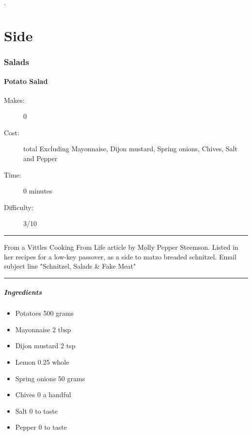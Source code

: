 \documentclass[]{article}
\begin{document}
\newpage
\color{white}.\color{black}
\vspace{5cm}
\part{\Huge Side}
\newpage
{}
\section*{\center\Huge\color{accent}Salads}
\label{cat:Salads}
\label{rec:Potato Salad}
\subsection*{\center\huge Potato Salad}
\begin{description}
\item[Makes:] 0 
\item[Cost:]  total Excluding Mayonnaise, Dijon mustard, Spring onions, Chives, Salt and Pepper
\item[Time:] 0 minutes
\item[Difficulty:] 3/10
\end{description}
\vspace{0.2cm}\hrule\vspace{0.5cm}
\begin{adjustwidth}{0.5 cm}{0.5 cm}

From a Vittles Cooking From Life article by Molly Pepper Steemson. Listed in her recipes for a low-key passover, as a side to matzo breaded schnitzel. Email subject line "Schnitzel, Salads \& Fake Meat" \hfill\color{accent}{\Large\faVimeoSquare\hspace{0.1cm}\faGlide\hspace{0.1cm}\faTruck\hspace{0.1cm}}\color{black}

\end{adjustwidth}
\vspace{0.5cm}\hrule
\subsubsection*{\Large Ingredients}
\begin{multicols}{2}
\begin{itemize}
 \item Potatoes \hfill 500 grams
 \item Mayonnaise \hfill 2 tbsp
 \item Dijon mustard \hfill 2 tsp
 \item Lemon \hfill 0.25 whole
 \item Spring onions \hfill 50 grams
 \item Chives \hfill 0 a handful
 \item Salt \hfill 0 to taste
 \item Pepper \hfill 0 to taste
\end{itemize}
\end{multicols}
\end{document}
